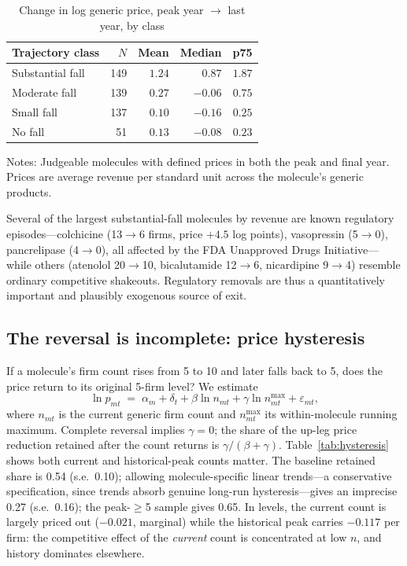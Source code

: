 \documentclass[11pt]{article}
\begin{document}
\begin{table}[htbp]
\centering
\caption{Change in log generic price, peak year $\to$ last year, by class}
\label{tab:pricefall}
\begin{tabular}{lrrrr}
\toprule
Trajectory class & $N$ & Mean & Median & p75 \\
\midrule
Substantial fall & 149 & $1.24$  & $0.87$  & $1.87$ \\
Moderate fall    & 139 & $0.27$  & $-0.06$ & $0.75$ \\
Small fall       & 137 & $0.10$  & $-0.16$ & $0.25$ \\
No fall          &  51 & $0.13$  & $-0.08$ & $0.23$ \\
\bottomrule
\end{tabular}
\par\smallskip
\parbox{0.92\textwidth}{\footnotesize Notes: Judgeable molecules with
defined prices in both the peak and final year. Prices are average revenue
per standard unit across the molecule's generic products.}
\end{table}

Several of the largest substantial-fall molecules by revenue are known
regulatory episodes---colchicine (13$\to$6 firms, price $+4.5$ log points),
vasopressin (5$\to$0), pancrelipase (4$\to$0), all affected by the FDA
Unapproved Drugs Initiative---while others (atenolol 20$\to$10, bicalutamide
12$\to$6, nicardipine 9$\to$4) resemble ordinary competitive shakeouts.
Regulatory removals are thus a quantitatively important and plausibly
exogenous source of exit.

\subsection{The reversal is incomplete: price hysteresis}

If a molecule's firm count rises from 5 to 10 and later falls back to 5,
does the price return to its original 5-firm level? We estimate
\begin{equation*}
\ln p_{mt} \;=\; \alpha_m + \delta_t + \beta \ln n_{mt}
 + \gamma \ln n^{\max}_{mt} + \varepsilon_{mt},
\end{equation*}
where $n_{mt}$ is the current generic firm count and $n^{\max}_{mt}$ its
within-molecule running maximum. Complete reversal implies $\gamma = 0$;
the share of the up-leg price reduction retained after the count returns is
$\gamma/(\beta+\gamma)$. Table~\ref{tab:hysteresis} shows both current and
historical-peak counts matter. The baseline retained share is 0.54 (s.e.\
0.10); allowing molecule-specific linear trends---a conservative
specification, since trends absorb genuine long-run hysteresis---gives an
imprecise 0.27 (s.e.\ 0.16); the peak-$\geq$5 sample gives 0.65. In levels,
the current count is largely priced out ($-0.021$, marginal) while the
historical peak carries $-0.117$ per firm: the competitive effect of the
\emph{current} count is concentrated at low $n$, and history dominates
elsewhere.
\end{document}
